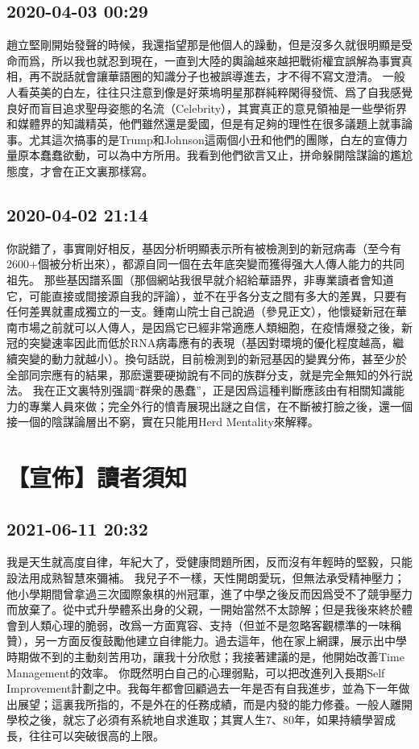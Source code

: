 \documentclass[twocolumn]{ctexart}
\begin{document}
\subsection*{2020-04-03 00:29}

趙立堅剛開始發聲的時候，我還指望那是他個人的躁動，但是沒多久就很明顯是受命而爲，所以我也就忍到現在，一直到大陸的輿論越來越把戰術權宜誤解為事實真相，再不説話就會讓華語圈的知識分子也被誤導進去，才不得不寫文澄清。 
一般人看英美的白左，往往只注意到像是好萊塢明星那群純粹閑得發慌、爲了自我感覺良好而盲目追求聖母姿態的名流（Celebrity），其實真正的意見領袖是一些學術界和媒體界的知識精英，他們雖然還是愛國，但是有足夠的理性在很多議題上就事論事。尤其這次搞事的是Trump和Johnson這兩個小丑和他們的團隊，白左的宣傳力量原本蠢蠢欲動，可以為中方所用。我看到他們欲言又止，拼命躲開陰謀論的尷尬態度，才會在正文裏那樣寫。
\subsection*{2020-04-02 21:14}

你説錯了，事實剛好相反，基因分析明顯表示所有被檢測到的新冠病毒（至今有2600+個被分析出來），都源自同一個在去年底突變而獲得强大人傳人能力的共同祖先。 
那些基因譜系圖（那個網站我很早就介紹給華語界，非專業讀者會知道它，可能直接或間接源自我的評論），並不在乎各分支之間有多大的差異，只要有任何差異就畫成獨立的一支。鍾南山院士自己說過（參見正文），他懷疑新冠在華南市場之前就可以人傳人，是因爲它已經非常適應人類細胞，在疫情爆發之後，新冠的突變速率因此而低於RNA病毒應有的表現（基因對環境的優化程度越高，繼續突變的動力就越小）。換句話説，目前檢測到的新冠基因的變異分佈，甚至少於全部同宗應有的結果，那麽還要硬拗說有不同的族群分支，就是完全無知的外行説法。 
我在正文裏特別强調“群衆的愚蠢”，正是因爲這種判斷應該由有相關知識能力的專業人員來做；完全外行的憤青展現出謎之自信，在不斷被打臉之後，還一個接一個的陰謀論層出不窮，實在只能用Herd Mentality來解釋。
\section*{【宣佈】讀者須知}
\subsection*{2021-06-11 20:32}

我是天生就高度自律，年紀大了，受健康問題所困，反而沒有年輕時的堅毅，只能設法用成熟智慧來彌補。
我兒子不一樣，天性開朗愛玩，但無法承受精神壓力；他小學期間曾拿過三次國際象棋的州冠軍，進了中學之後反而因爲受不了競爭壓力而放棄了。從中式升學體系出身的父親，一開始當然不太諒解；但是我後來終於體會到人類心理的脆弱，改爲一方面寬容、支持（但並不是忽略客觀標準的一味稱贊），另一方面反復鼓勵他建立自律能力。過去這年，他在家上網課，展示出中學時期做不到的主動刻苦用功，讓我十分欣慰；我接著建議的是，他開始改善Time Management的效率。
你既然明白自己的心理弱點，可以把改進列入長期Self Improvement計劃之中。我每年都會回顧過去一年是否有自我進步，並為下一年做出展望；這裏我所指的，不是外在的任務成績，而是内發的能力修養。一般人離開學校之後，就忘了必須有系統地自求進取；其實人生7、80年，如果持續學習成長，往往可以突破很高的上限。
\end{document}
